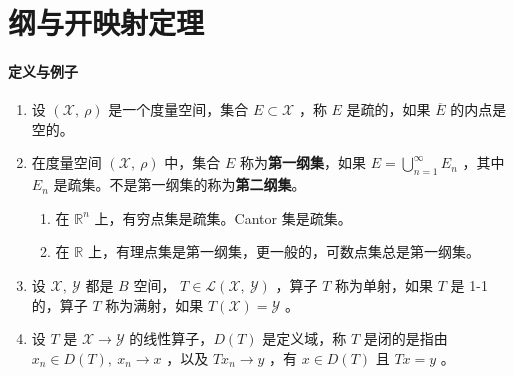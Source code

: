 \section{纲与开映射定理}
\paragraph{定义与例子}
\begin{enumerate}[leftmargin=2cm, label=\arabic*]
    \item 设 $(\mathscr{X},\ \rho)$ 是一个度量空间，集合 $E\subset \mathscr{X}$ ，称 $E$ 是疏的，如果 $\overline{E}$ 的内点是空的。
    \item 在度量空间 $(\mathscr{X},\ \rho)$ 中，集合 $E$ 称为\textbf{第一纲集}，如果 $E = \bigcup\limits_{n=1}^{\infty} E_n$ ，其中 $E_n$ 是疏集。不是第一纲集的称为\textbf{第二纲集}。
    \begin{enumerate}[leftmargin=1cm, label=(\arabic*)]
        \item 在 $\mathbb{R}^n$ 上，有穷点集是疏集。Cantor 集是疏集。
        \item 在 $\mathbb{R}$ 上，有理点集是第一纲集，更一般的，可数点集总是第一纲集。
    \end{enumerate}
    \item 设 $\mathscr{X},\ \mathscr{Y}$ 都是 $B$ 空间， $T\in\mathscr{L}(\mathscr{X},\ \mathscr{Y})$ ，算子 $T$ 称为单射，如果 $T$ 是 1-1 的，算子 $T$ 称为满射，如果 $T(\mathscr{X}) = \mathscr{Y}$ 。
    \item 设 $T$ 是 $\mathscr{X}\to\mathscr{Y}$ 的线性算子，$D(T)$ 是定义域，称 $T$ 是闭的是指由 $x_n\in D(T),\ x_n\to x$ ，以及 $Tx_n\to y$ ，有 $x\in D(T)$ 且 $Tx = y$ 。
\end{enumerate}

